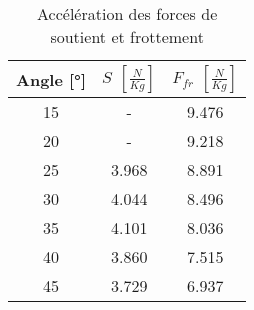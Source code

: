 \begin{table}
\centering
\begin{tabular}{|c|c|c|}
\hline
Angle [°] &$S$ $\left[ \frac{N}{Kg} \right]$ & $F_{fr}$ $\left[ \frac{N}{Kg} \right]$ \\
           \hline
15        &- & 9.476 \\
           \hline
20        &- & 9.218 \\
           \hline
25        &3.968 & 8.891 \\
           \hline
30        &4.044 & 8.496 \\
           \hline
35        &4.101 & 8.036 \\
           \hline
40        &3.860 & 7.515 \\
           \hline
45        &3.729 & 6.937 \\
           \hline
\end{tabular}
\caption{Accélération des forces de soutient et frottement}
\label{table:v-app}
\end{table}
